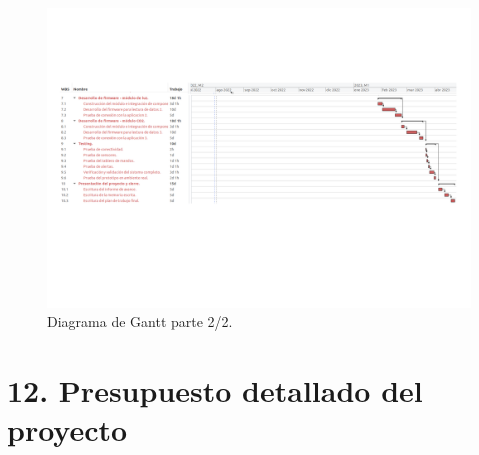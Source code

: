 \documentclass[
11pt, %
]{charter}
\begin{document}
\begin{landscape}
\begin{figure}[htpb]
\centering 
\includegraphics[height=.90\textheight]{./Figuras/DiagramaGantt_2.png}
\caption{Diagrama de Gantt parte 2/2.}
\label{fig:diagGantt}
\end{figure}
\end{landscape}



\section{12. Presupuesto detallado del proyecto}
\label{sec:presupuesto}
\end{document}
